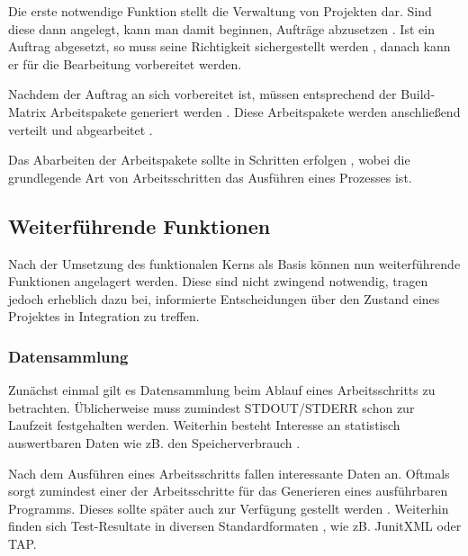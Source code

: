 Die erste notwendige Funktion stellt die Verwaltung von Projekten  dar.
Sind diese dann angelegt, kann man damit beginnen, Aufträge abzusetzen .
Ist ein Auftrag abgesetzt, so muss seine Richtigkeit sichergestellt werden ,
danach kann er für die Bearbeitung  vorbereitet werden.

Nachdem der Auftrag an sich vorbereitet ist, müssen entsprechend der Build-Matrix 
Arbeitspakete generiert werden .
Diese Arbeitspakete werden anschließend verteilt  und abgearbeitet .

Das Abarbeiten der Arbeitspakete sollte in Schritten erfolgen ,
wobei die grundlegende Art von Arbeitsschritten das Ausführen eines Prozesses  ist.


\subsection{Weiterführende Funktionen}

Nach der Umsetzung des funktionalen Kerns als Basis
k\"onnen nun weiterf\"uhrende Funktionen angelagert werden.
Diese sind nicht zwingend notwendig, tragen jedoch erheblich dazu bei,
informierte Entscheidungen \"uber den Zustand eines Projektes in Integration zu treffen.

\subsubsection{Datensammlung}

Zun\"achst einmal gilt es Datensammlung beim Ablauf eines Arbeitsschritts zu betrachten.
\"Ublicherweise muss zumindest STDOUT/STDERR schon zur Laufzeit festgehalten  werden.
Weiterhin besteht  Interesse an statistisch auswertbaren Daten
wie zB. den Speicherverbrauch .

Nach dem Ausf\"uhren eines Arbeitsschritts fallen interessante Daten an.
Oftmals sorgt zumindest einer der Arbeitsschritte für das Generieren eines ausführbaren Programms.
Dieses sollte sp\"ater auch zur Verf\"ugung gestellt werden .
Weiterhin finden sich Test-Resultate in diversen Standardformaten ,
wie zB. JunitXML \cite{jenkins:junitxml} oder \ac{TAP}.

